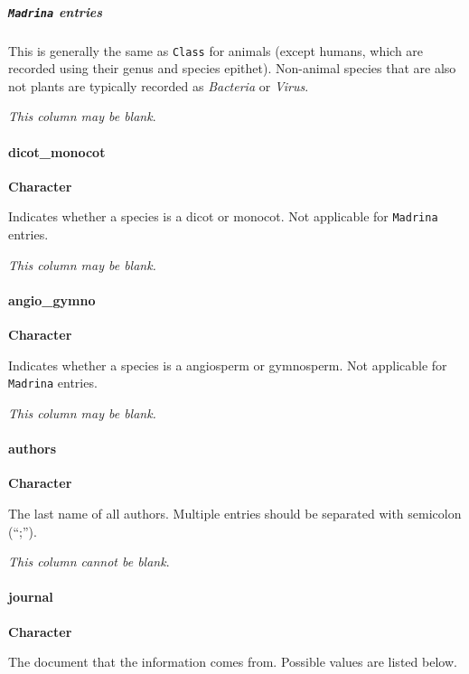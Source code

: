 \documentclass[]{article}
\let\oldparagraph\paragraph
\renewcommand{\paragraph}[1]{\oldparagraph{#1}\mbox{}}
\let\oldsubparagraph\subparagraph
\renewcommand{\subparagraph}[1]{\oldsubparagraph{#1}\mbox{}}
\begin{document}
\subparagraph{\texorpdfstring{\texttt{Madrina}
entries}{Madrina entries}}\label{madrina-entries}

This is generally the same as \texttt{Class} for animals (except humans,
which are recorded using their genus and species epithet). Non-animal
species that are also not plants are typically recorded as
\emph{Bacteria} or \emph{Virus}.

\emph{This column may be blank}.

\paragraph{dicot\_monocot}\label{dicot_monocot}

\textbf{Character}

Indicates whether a species is a dicot or monocot. Not applicable for
\texttt{Madrina} entries.

\emph{This column may be blank.}

\paragraph{angio\_gymno}\label{angio_gymno}

\textbf{Character}

Indicates whether a species is a angiosperm or gymnosperm. Not
applicable for \texttt{Madrina} entries.

\emph{This column may be blank.}

\paragraph{authors}\label{authors}

\textbf{Character}

The last name of all authors. Multiple entries should be separated with
semicolon (``;'').

\emph{This column cannot be blank}.

\paragraph{journal}\label{journal}

\textbf{Character}

The document that the information comes from. Possible values are listed
below.
\end{document}
